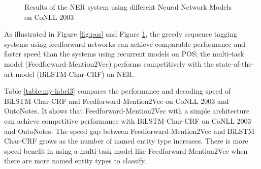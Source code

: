 \begin{figure}
 \caption{Results of the NER system using different Neural Network Models on CoNLL 2003}
  \label{fig:ner}
\end{figure}

As illustrated in Figure \ref{fig:pos} and Figure \ref{fig:ner}, the greedy sequence tagging systems using feedforward networks can achieve comparable performance and faster speed than the systems using recurrent models on POS; the multi-task model (Feedforward-Mention2Vec) performs competitively with the state-of-the-art model (BiLSTM-Char-CRF) on NER.

Table \ref{table:my-label3} compares the performance and decoding speed of BiLSTM-Char-CRF and Feedforward-Mention2Vec on CoNLL 2003 and OntoNotes. It shows that Feedforward-Mention2Vec with a simple architecture can achieve competitive performance with BiLSTM-Char-CRF on CoNLL 2003 and OntoNotes. The speed gap between Feedforward-Mention2Vec and BiLSTM-Char-CRF grows as the number of named entity type increases. There is more speed benefit in using a multi-task model like Feedforward-Mention2Vec when there are more named entity types to classify. 

